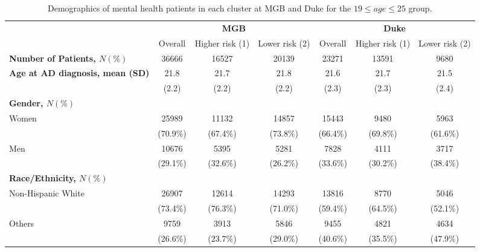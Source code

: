 \documentclass{article}
\begin{document}
\begin{table}[H]
    \centering
    \scriptsize
    \begin{tabular}{l c c c c c c}
\toprule
& \multicolumn{3}{c}{\textbf{MGB}}&
\multicolumn{3}{c}{\textbf{Duke}}\\
\cmidrule(r){2-4}\cmidrule(l){5-7}
& Overall & Higher risk (1) & Lower risk (2) & Overall & Higher risk (1) & Lower risk (2)  \\
\bottomrule
\textbf{Number of Patients, $N(\%)$} & 36666 & 16527 & 20139 & 23271 & 13591 & 9680 \\
\bottomrule
\textbf{Age at AD diagnosis, mean (SD)} & 21.8 & 21.7 & 21.8 & 21.6 & 21.7 & 21.5 \\
 & (2.2) & (2.2) & (2.2) & (2.3) & (2.3) & (2.4) \\
\bottomrule
\textbf{Gender, $N(\%)$}\\
Women & 25989 & 11132 & 14857 & 15443 & 9480 & 5963 \\
 & (70.9\%) & (67.4\%) & (73.8\%) & (66.4\%) & (69.8\%) & (61.6\%) \\
Men & 10676 & 5395 & 5281 & 7828 & 4111 & 3717 \\
 & (29.1\%) & (32.6\%) & (26.2\%) & (33.6\%) & (30.2\%) & (38.4\%) \\
\bottomrule
\textbf{Race/Ethnicity, $N(\%)$} \\
Non-Hispanic White & 26907 & 12614 & 14293 & 13816 & 8770 & 5046 \\
 & (73.4\%) & (76.3\%) & (71.0\%) & (59.4\%) & (64.5\%) & (52.1\%) \\
Others & 9759 & 3913 & 5846 & 9455 & 4821 & 4634 \\
 & (26.6\%) & (23.7\%) & (29.0\%) & (40.6\%) & (35.5\%) & (47.9\%) \\
\bottomrule
\end{tabular}
\caption{Demographics of mental health patients in each cluster at MGB and Duke for the $19 \le age \le 25$ group.}
\label{tab:mental_demo_19-25}
\end{table}
\end{document}
